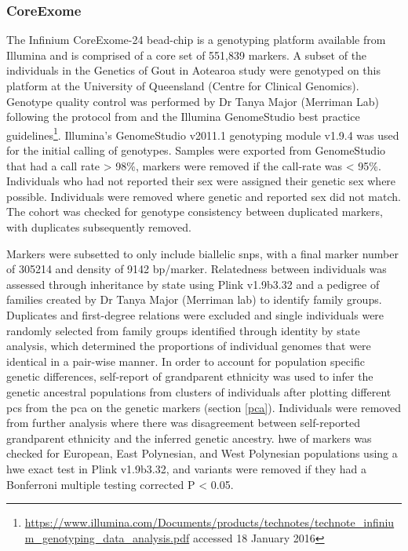 \documentclass[twoside,openright]{report}
\begin{document}
\subsubsection{CoreExome}\label{coreExomeQC}

The Infinium CoreExome-24 bead-chip is a genotyping platform available
from Illumina and is comprised of a core set of 551,839 markers. A
subset of the individuals in the Genetics of Gout in Aotearoa study were
genotyped on this platform at the University of Queensland (Centre for
Clinical Genomics). Genotype quality control was performed by Dr Tanya
Major (Merriman Lab) following the protocol from \citet{Guo2014} and the
Illumina GenomeStudio best practice guidelines\footnote{\url{https://www.illumina.com/Documents/products/technotes/technote_infinium_genotyping_data_analysis.pdf}
  accessed 18 January 2016}. Illumina's GenomeStudio v2011.1 genotyping
module v1.9.4 was used for the initial calling of genotypes. Samples
were exported from GenomeStudio that had a call rate \textgreater{}
98\%, markers were removed if the call-rate was \textless{} 95\%.
Individuals who had not reported their sex were assigned their genetic
sex where possible. Individuals were removed where genetic and reported
sex did not match. The cohort was checked for genotype consistency
between duplicated markers, with duplicates subsequently removed.

Markers were subsetted to only include biallelic \glspl{snp}, with a
final marker number of 305214 and density of 9142 bp/marker. Relatedness
between individuals was assessed through inheritance by state using
Plink v1.9b3.32 and a pedigree of families created by Dr Tanya Major
(Merriman lab) to identify family groups. Duplicates and first-degree
relations were excluded and single individuals were randomly selected
from family groups identified through identity by state analysis, which
determined the proportions of individual genomes that were identical in
a pair-wise manner. In order to account for population specific genetic
differences, self-report of grandparent ethnicity was used to infer the
genetic ancestral populations from clusters of individuals after
plotting different \glspl{pc} from the \gls{pca} on the genetic markers
(section \ref{pca}). Individuals were removed from further analysis
where there was disagreement between self-reported grandparent ethnicity
and the inferred genetic ancestry. \Glsdesc{hwe} of markers was checked
for European, East Polynesian, and West Polynesian populations using a
\gls{hwe} exact test \citep{Wigginton2005} in Plink v1.9b3.32, and
variants were removed if they had a Bonferroni multiple testing
corrected P \textless{} 0.05.
\end{document}
